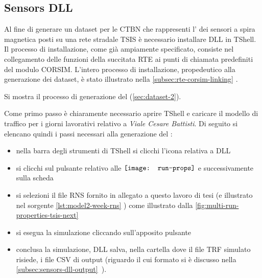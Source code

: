 \subsection{Sensors DLL}
Al fine di generare un dataset per le \acs{CTBN} che rappresenti l' dei sensori a spira magnetica posti su una rete stradale \acs{TSIS} è necessario installare  \acs{DLL} in \acs{TShell}. Il processo di installazione, come già ampiamente specificato, consiste nel collegamento delle funzioni della succitata \acs{RTE} ai punti di chiamata predefiniti del modulo \acs{CORSIM}. L'intero processo di installazione, propedeutico alla generazione dei dataset, è stato illustrato nella \autoref{subsec:rte-corsim-linking} .

Si mostra il processo di generazione del  (\vref{sec:dataset-2}).

Come primo passo è chiaramente necessario aprire \acs{TShell} e caricare il modello di traffico per i giorni lavorativi relativo a \emph{Viale Cesare Battisti}. Di seguito si elencano quindi i passi necessari alla generazione del :
\begin{itemize}
	\item nella barra degli strumenti di \acs{TShell} si clicchi l'icona relativa a  \acs{DLL}
	\item si clicchi sul pulsante relativo alle \emph{} $\vcenter{\hbox{\texttt{[image: run-props]}}}$ e successivamente sulla scheda \emph{}
	\item si selezioni il file \acs{RNS} fornito in allegato a questo lavoro di tesi (e illustrato nel sorgente \ref{lst:model2-week-rns} ) come illustrato dalla \vref{fig:multi-run-properties-tsis-next}
	\item si esegua la simulazione cliccando sull'apposito pulsante
	\item conclusa la simulazione,  \acs{DLL} salva, nella cartella dove il file \acs{TRF} simulato risiede, i file \acs{CSV} di output (riguardo il cui formato si è discusso nella \autoref{subsec:sensors-dll-output}~).
\end{itemize}

